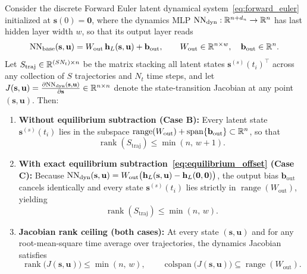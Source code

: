 \begin{proposition}
\label{prop:dyn_rank_bound}
Consider the discrete Forward Euler latent dynamical system~\eqref{eq:forward_euler} initialized at $\mathbf{s}(0) = \mathbf{0}$, where the dynamics MLP $\mathrm{NN}_{\mathrm{dyn}} : \mathbb{R}^{n + d_u} \to \mathbb{R}^n$ has last hidden layer width $w$, so that its output layer reads
\[
  \mathrm{NN}_{\mathrm{base}}(\mathbf{s},\mathbf{u}) = W_{\mathrm{out}}\,\mathbf{h}_L(\mathbf{s},\mathbf{u}) + \mathbf{b}_{\mathrm{out}}, \qquad W_{\mathrm{out}} \in \mathbb{R}^{n \times w}, \quad \mathbf{b}_{\mathrm{out}} \in \mathbb{R}^n.
\]
Let $S_{\mathrm{traj}} \in \mathbb{R}^{(S N_t) \times n}$ be the matrix stacking all latent states $\mathbf{s}^{(s)}(t_i)^\top$ across any collection of $S$ trajectories and $N_t$ time steps, and let $J(\mathbf{s},\mathbf{u}) = \frac{\partial \mathrm{NN}_{\mathrm{dyn}}(\mathbf{s},\mathbf{u})}{\partial \mathbf{s}} \in \mathbb{R}^{n \times n}$ denote the state-transition Jacobian at any point $(\mathbf{s},\mathbf{u})$. Then:
\begin{enumerate}[label=(\roman*),leftmargin=2.2em]
  \item \textbf{Without equilibrium subtraction (Case B):} Every latent state $\mathbf{s}^{(s)}(t_i)$ lies in the subspace $\operatorname{range}(W_{\mathrm{out}}) + \operatorname{span}\{\mathbf{b}_{\mathrm{out}}\} \subset \mathbb{R}^n$, so that
  \begin{equation}
    \operatorname{rank}(S_{\mathrm{traj}}) \le \min(n,\, w + 1).
    \label{eq:traj_rank_no_eq}
  \end{equation}
  \item \textbf{With exact equilibrium subtraction~\eqref{eq:equilibrium_offset} (Case C):} Because $\mathrm{NN}_{\mathrm{dyn}}(\mathbf{s},\mathbf{u}) = W_{\mathrm{out}}\big(\mathbf{h}_L(\mathbf{s},\mathbf{u}) - \mathbf{h}_L(\mathbf{0},\mathbf{0})\big)$, the output bias $\mathbf{b}_{\mathrm{out}}$ cancels identically and every state $\mathbf{s}^{(s)}(t_i)$ lies strictly in $\operatorname{range}(W_{\mathrm{out}})$, yielding
  \begin{equation}
    \operatorname{rank}(S_{\mathrm{traj}}) \le \min(n,\, w).
    \label{eq:traj_rank_eq}
  \end{equation}
  \item \textbf{Jacobian rank ceiling (both cases):} At every state $(\mathbf{s},\mathbf{u})$ and for any root-mean-square time average over trajectories, the dynamics Jacobian satisfies
  \begin{equation}
    \operatorname{rank}\!\big(J(\mathbf{s},\mathbf{u})\big) \le \min(n,\, w), \qquad \operatorname{colspan}\!\big(J(\mathbf{s},\mathbf{u})\big) \subseteq \operatorname{range}(W_{\mathrm{out}}).
    \label{eq:jac_rank_bound}
  \end{equation}
\end{enumerate}
\end{proposition}


